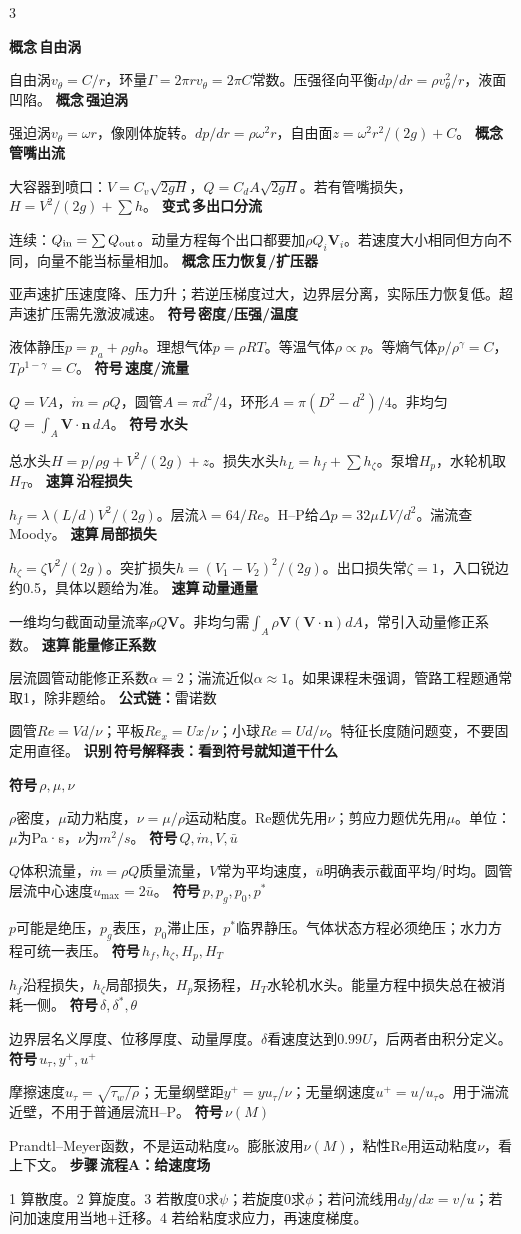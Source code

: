\documentclass[a4paper]{article}
\newcommand{\form}[1]{{\color{M}\bfseries 公式链：}#1\par}
\newcommand{\labtag}[3]{{\bfseries\color{#1}\colorbox{#1}{\color{white}\fontsize{2.35}{2.48}\selectfont #2}\,#3}\par}
\newcommand{\var}[1]{\labtag{V}{变式}{#1}}
\newcommand{\iden}[1]{\labtag{C}{识别}{#1}}
\newcommand{\step}[1]{\labtag{S}{步骤}{#1}}
\newcommand{\concept}[1]{\labtag{V}{概念}{#1}}
\newcommand{\sym}[1]{\labtag{F}{符号}{#1}}
\newcommand{\varq}[1]{\var{#1}}
\newcommand{\idq}[1]{\iden{#1}}
\newcommand{\stepq}[1]{\step{#1}}
\newcommand{\formq}[1]{\form{#1}}
\newcommand{\conceptq}[1]{\concept{#1}}
\newcommand{\symq}[1]{\sym{#1}}
\newcommand{\quickq}[1]{\labtag{F}{速算}{#1}}
\newenvironment{vfourWrap}{\par\begingroup\fontsize{2.68}{2.84}\selectfont\setlength{\fboxsep}{0.45pt}}{\par\endgroup}
\begin{document}
\begin{multicols}{3}
\begin{vfourWrap}
\conceptq{自由涡}
自由涡$v_\theta=C/r$，环量$\Gamma=2\pi r v_\theta=2\pi C$常数。压强径向平衡$dp/dr=\rho v_\theta^2/r$，液面凹陷。
\conceptq{强迫涡}
强迫涡$v_\theta=\omega r$，像刚体旋转。$dp/dr=\rho\omega^2r$，自由面$z=\omega^2r^2/(2g)+C$。
\conceptq{管嘴出流}
大容器到喷口：$V=C_v\sqrt{2gH}$，$Q=C_dA\sqrt{2gH}$。若有管嘴损失，$H=V^2/(2g)+\sum h$。
\varq{多出口分流}
连续：$Q_{\rm in}=\sum Q_{\rm out}$。动量方程每个出口都要加$\rho Q_i\bm V_i$。若速度大小相同但方向不同，向量不能当标量相加。
\conceptq{压力恢复/扩压器}
亚声速扩压速度降、压力升；若逆压梯度过大，边界层分离，实际压力恢复低。超声速扩压需先激波减速。
\symq{密度/压强/温度}
液体静压$p=p_a+\rho gh$。理想气体$p=\rho RT$。等温气体$\rho\propto p$。等熵气体$p/\rho^\gamma=C$，$T\rho^{1-\gamma}=C$。
\symq{速度/流量}
$Q=VA$，$\dot m=\rho Q$，圆管$A=\pi d^2/4$，环形$A=\pi(D^2-d^2)/4$。非均匀$Q=\int_A\bm V\cdot\bm n\,dA$。
\symq{水头}
总水头$H=p/\rho g+V^2/(2g)+z$。损失水头$h_L=h_f+\sum h_\zeta$。泵增$H_p$，水轮机取$H_T$。
\quickq{沿程损失}
$h_f=\lambda(L/d)V^2/(2g)$。层流$\lambda=64/Re$。H--P给$\Delta p=32\mu LV/d^2$。湍流查Moody。
\quickq{局部损失}
$h_\zeta=\zeta V^2/(2g)$。突扩损失$h=(V_1-V_2)^2/(2g)$。出口损失常$\zeta=1$，入口锐边约0.5，具体以题给为准。
\quickq{动量通量}
一维均匀截面动量流率$\rho Q\bm V$。非均匀需$\int_A\rho\bm V(\bm V\cdot\bm n)dA$，常引入动量修正系数。
\quickq{能量修正系数}
层流圆管动能修正系数$\alpha=2$；湍流近似$\alpha\approx1$。如果课程未强调，管路工程题通常取1，除非题给。
\formq{雷诺数}
圆管$Re=Vd/\nu$；平板$Re_x=Ux/\nu$；小球$Re=Ud/\nu$。特征长度随问题变，不要固定用直径。
\idq{符号解释表：看到符号就知道干什么}
\symq{$\rho,\mu,\nu$}
$\rho$密度，$\mu$动力粘度，$\nu=\mu/\rho$运动粘度。Re题优先用$\nu$；剪应力题优先用$\mu$。单位：$\mu$为Pa·s，$\nu$为$m^2/s$。
\symq{$Q,\dot m,V,\bar u$}
$Q$体积流量，$\dot m=\rho Q$质量流量，$V$常为平均速度，$\bar u$明确表示截面平均/时均。圆管层流中心速度$u_{\max}=2\bar u$。
\symq{$p,p_g,p_0,p^*$}
$p$可能是绝压，$p_g$表压，$p_0$滞止压，$p^*$临界静压。气体状态方程必须绝压；水力方程可统一表压。
\symq{$h_f,h_\zeta,H_p,H_T$}
$h_f$沿程损失，$h_\zeta$局部损失，$H_p$泵扬程，$H_T$水轮机水头。能量方程中损失总在被消耗一侧。
\symq{$\delta,\delta^*,\theta$}
边界层名义厚度、位移厚度、动量厚度。$\delta$看速度达到$0.99U$，后两者由积分定义。
\symq{$u_\tau,y^+,u^+$}
摩擦速度$u_\tau=\sqrt{\tau_w/\rho}$；无量纲壁距$y^+=yu_\tau/\nu$；无量纲速度$u^+=u/u_\tau$。用于湍流近壁，不用于普通层流H--P。
\symq{$\nu(M)$}
Prandtl--Meyer函数，不是运动粘度$\nu$。膨胀波用$\nu(M)$，粘性Re用运动粘度$\nu$，看上下文。
\stepq{流程A：给速度场}
1 算散度。2 算旋度。3 若散度0求$\psi$；若旋度0求$\phi$；若问流线用$dy/dx=v/u$；若问加速度用当地+迁移。4 若给粘度求应力，再速度梯度。

\end{vfourWrap}
\end{multicols}
\end{document}
